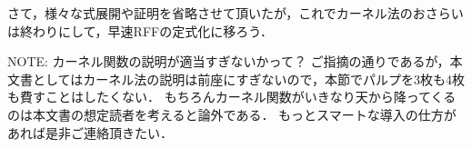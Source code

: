 さて，様々な式展開や証明を省略させて頂いたが，これでカーネル法のおさらいは終わりにして，早速RFFの定式化に移ろう．

\begin{displayquote}\footnotesize\textsf{NOTE:}
カーネル関数の説明が適当すぎないかって？
ご指摘の通りであるが，本文書としてはカーネル法の説明は前座にすぎないので，本節でパルプを3枚も4枚も費すことはしたくない．
もちろんカーネル関数がいきなり天から降ってくるのは本文書の想定読者を考えると論外である．
もっとスマートな導入の仕方があれば是非ご連絡頂きたい．
\end{displayquote}

